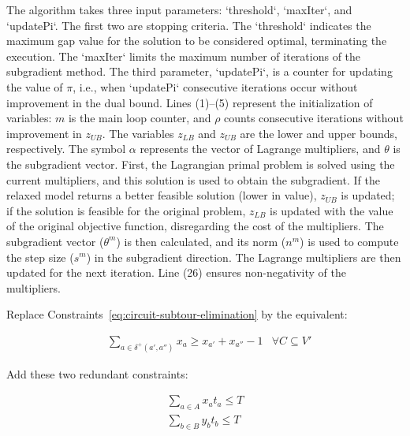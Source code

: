 The algorithm takes three input parameters: `threshold`, `maxIter`, and
`updatePi`. The first two are stopping criteria. The `threshold` indicates the
maximum gap value for the solution to be considered optimal, terminating the
execution. The `maxIter` limits the maximum number of iterations of the
subgradient method. The third parameter, `updatePi`, is a counter for updating
the value of $\pi$, i.e., when `updatePi` consecutive iterations occur without
improvement in the dual bound. Lines (1)–(5) represent the initialization of
variables: $m$ is the main loop counter, and $\rho$ counts consecutive
iterations without improvement in $z_{UB}$. The variables $z_{LB}$ and $z_{UB}$
are the lower and upper bounds, respectively. The symbol $\alpha$ represents the
vector of Lagrange multipliers, and $\theta$ is the subgradient vector. First,
the Lagrangian primal problem is solved using the current multipliers, and this
solution is used to obtain the subgradient. If the relaxed model returns a
better feasible solution (lower in value), $z_{UB}$ is updated; if the solution
is feasible for the original problem, $z_{LB}$ is updated with the value of the
original objective function, disregarding the cost of the multipliers. The
subgradient vector ($\theta^m$) is then calculated, and its norm ($n^m$) is used
to compute the step size ($s^m$) in the subgradient direction. The Lagrange
multipliers are then updated for the next iteration. Line (26) ensures
non-negativity of the multipliers.



Replace Constraints~\eqref{eq:circuit-subtour-elimination} by the equivalent:

\begin{align}
	 & \sum_{a \in \delta^{+}({a'}, {{a''}} )} x_{a} \geq x_{a'} + x_{a''} - 1 & \forall C \subseteq V' \label{eq:circuit-subtour-elimination-2}
\end{align}

Add these two redundant constraints:

\begin{align}
	 & \sum_{a \in A}x_{a} t_{a} \leq T & \label{eq:max-time-x} \\
	 & \sum_{b \in B}y_{b} t_{b} \leq T & \label{eq:max-time-y}
\end{align}

